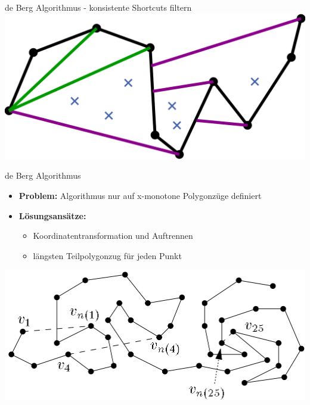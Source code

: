 \documentclass[14pt]{beamer}
\begin{document}
\begin{frame}{de Berg Algorithmus - konsistente Shortcuts filtern}
\includegraphics[width=1.0\textwidth]{img/discard_accept.png}
\end{frame}

\begin{frame}{de Berg Algorithmus}
  \begin{itemize}
  	\item \textbf{Problem:} Algorithmus nur auf x-monotone Polygonzüge definiert
	\item \textbf{Lösungsansätze:}
		\begin{itemize}
			\item Koordinatentransformation und Auftrennen
			\item längsten Teilpolygonzug für jeden Punkt
		\end{itemize}
  \end{itemize}
\includegraphics[width=1.0\textwidth]{img/determineSubchain.png}  
\end{frame}
\end{document}
